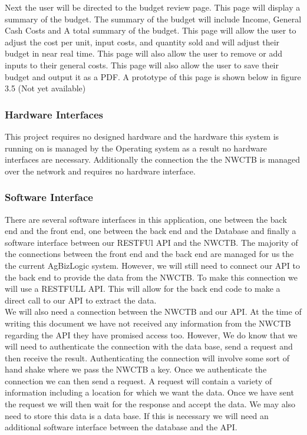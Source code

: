 \documentclass[onecolumn, draftclsnofoot,10pt, compsoc]{article}
\begin{document}
					Next the user will be directed to the budget review page. This page will display a summary of the budget. The summary of the budget will include Income, General Cash Costs and A total summary of the budget. This page will allow the user to adjust the cost per unit, input costs, and quantity sold and will adjust their budget in near real time. This page will also allow the user to remove or add inputs to their general costs. This page will also allow the user to save their budget and output it as a PDF. A prototype of this page is shown below in figure 3.5 (Not yet available)\\			
					

        \subsubsection{Hardware Interfaces}
					This project requires no designed hardware and the hardware this system is running on is managed by the Operating system as a result no hardware interfaces are necessary. Additionally the connection the the NWCTB is managed over the network and requires no hardware interface.\\

        \subsubsection{Software Interface}
					There are several software interfaces in this application, one between the back end and the front end, one between the back end and the Database and finally a software interface between our RESTFUl API and the NWCTB. The majority of the connections between the front end and the back end are managed for us the the current AgBizLogic system. However, we will still need to connect our API to the back end to provide the data from the NWCTB. To make this connection we will use a RESTFULL API. This will allow for the back end code to make a direct call to our API to extract the data.\\
					We will also need a connection between the NWCTB and our API. At the time of writing this document we have not received any information from the NWCTB regarding the API they have promised access too. However, We do know that we will need to authenticate the connection with the data base, send a request and then receive the result. Authenticating the connection will involve some sort of hand shake where we pass the NWCTB a key. Once we authenticate the connection we can then send a request. A request will contain a variety of information including a location for which we want the data. Once we have sent the request we will then wait for the response and accept the data. We may also need to store this data is a data base. If this is necessary we will need an additional software interface between the database and the API.\\
\end{document}
